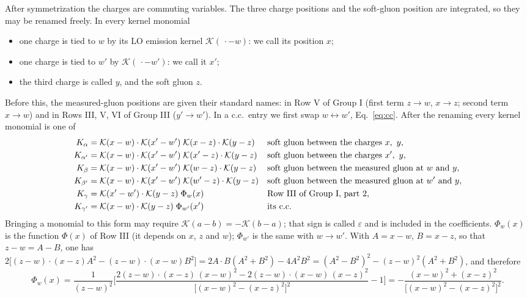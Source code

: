 \documentclass[10pt]{article}
\numberwithin{equation}{section}
\newcommand{\KK}{\mathcal K}
\begin{document}
After symmetrization the charges are commuting variables. The three charge positions and the soft-gluon position are integrated, so they may be renamed freely. In every kernel monomial
\begin{itemize}
\item one charge is tied to $w$ by its LO emission kernel $\KK(\,\cdot-w)$: we call its position $x$;
\item one charge is tied to $w'$ by $\KK(\,\cdot-w')$: we call it $x'$;
\item the third charge is called $y$, and the soft gluon $z$.
\end{itemize}
Before this, the measured-gluon positions are given their standard names: in Row V of Group I (first term $z\to w$, $x\to z$; second term $x\to w$) and in Rows III, V, VI of Group III ($y'\to w'$). In a c.c.\ entry we first swap $w\leftrightarrow w'$, Eq.~\eqref{eq:cc}. After the renaming every kernel monomial is one of
\begin{align}
K_\alpha&=\KK(x-w)\cdot\KK(x'-w')\;\KK(x-z)\cdot\KK(y-z) &&\text{soft gluon between the charges }x,\ y,\notag\\
K_{\alpha'}&=\KK(x-w)\cdot\KK(x'-w')\;\KK(x'-z)\cdot\KK(y-z) &&\text{soft gluon between the charges }x',\ y,\notag\\
K_\beta&=\KK(x-w)\cdot\KK(x'-w')\;\KK(w-z)\cdot\KK(y-z) &&\text{soft gluon between the measured gluon at }w\text{ and }y,\notag\\
K_{\beta'}&=\KK(x-w)\cdot\KK(x'-w')\;\KK(w'-z)\cdot\KK(y-z) &&\text{soft gluon between the measured gluon at }w'\text{ and }y,\notag\\
K_\gamma&=\KK(x'-w')\cdot\KK(y-z)\;\Phi_w(x) &&\text{Row III of Group I, part 2,}\notag\\
K_{\gamma'}&=\KK(x-w)\cdot\KK(y-z)\;\Phi_{w'}(x') &&\text{its c.c.}
\label{eq:classes}
\end{align}
Bringing a monomial to this form may require $\KK(a-b)=-\KK(b-a)$; that sign is called $\varepsilon$ and is included in the coefficients. $\Phi_w(x)$ is the function $\Phi(x)$ of Row III (it depends on $x$, $z$ and $w$); $\Phi_{w'}$ is the same with $w\to w'$. With $A=x-w$, $B=x-z$, so that $z-w=A-B$, one has $2\big[(z-w)\cdot(x-z)A^2-(z-w)\cdot(x-w)B^2\big]=2A\cdot B(A^2+B^2)-4A^2B^2=(A^2-B^2)^2-(z-w)^2(A^2+B^2)$, and therefore
\begin{equation}
\Phi_w(x)=\frac{1}{(z-w)^2}\bigg[\frac{2(z-w)\cdot(x-z)\,(x-w)^2-2(z-w)\cdot(x-w)\,(x-z)^2}{\big[(x-w)^2-(x-z)^2\big]^2}-1\bigg]=-\frac{(x-w)^2+(x-z)^2}{\big[(x-w)^2-(x-z)^2\big]^2}.
\label{eq:Phi}
\end{equation}
\end{document}
